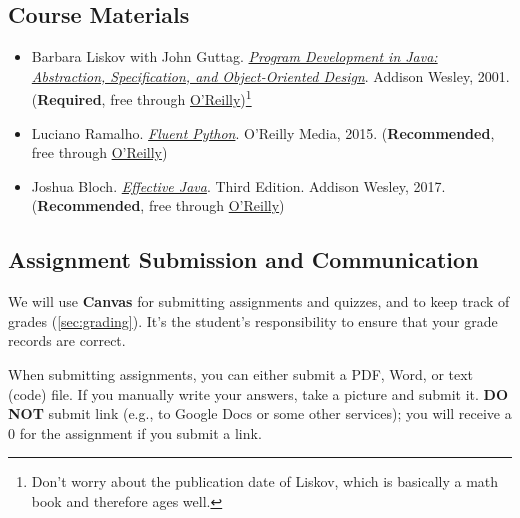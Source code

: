 \documentclass[11pt]{article}
\begin{document}
\subsection{Course Materials}
\begin{itemize}
  \item Barbara Liskov with John Guttag. \href{https://www.amazon.com/Program-Development-Java-Specification-Object-Oriented/dp/0201657686/ref=sr_1_2?dchild=1&qid=1626231221&refinements=p_27\%3ABarbara+Liskov&s=books&sr=1-2&text=Barbara+Liskov}{\emph{Program
  Development in Java: Abstraction, Specification, and Object-Oriented  Design}}. Addison Wesley, 2001.  (\textbf{Required}, free through \href{https://learning.oreilly.com/library/view/program-development-in/9780768685299/}{ O'Reilly})\footnote{Don't worry about the publication date of Liskov, which is basically a math book and therefore ages well.}


\item Luciano Ramalho. \href{https://www.amazon.com/Fluent-Python-Concise-Effective-Programming-dp-1492056359/dp/1492056359/ref=dp_ob_title_bk}{\emph{Fluent Python}}. O'Reilly Media, 2015. (\textbf{Recommended}, free through \href{https://learning.oreilly.com/library/view/fluent-python/9781492056348/}{O'Reilly})

\item Joshua Bloch.
\href{https://www.amazon.com/Effective-Java-Joshua-Bloch/dp/0134685997/ref=sr_1_1?dchild=1&keywords=effective+java&qid=1626231154&sr=8-1}{\emph{Effective
  Java}}. Third Edition. Addison Wesley, 2017. (\textbf{Recommended}, free through
        \href{https://learning.oreilly.com/library/view/effective-java-3rd/9780134686097/}{O'Reilly})

\end{itemize}


\subsection{Assignment Submission and Communication}
We will use \textbf{Canvas} for submitting assignments and quizzes, and to keep track of grades (\autoref{sec:grading}). 
It's the student's responsibility to ensure that your grade records are correct.

When submitting assignments, you can either submit a PDF, Word, or text (code) file.  If you manually write your answers, take a picture and submit it.  \textbf{DO NOT} submit link (e.g., to Google Docs or some other services); you will receive a 0 for the assignment if you submit a link.
\end{document}
